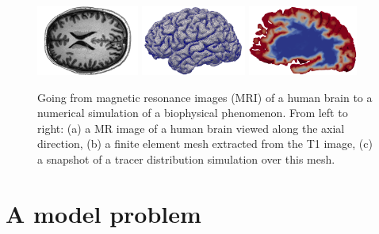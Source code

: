 \begin{figure}[t]
  \begin{center}
  \includegraphics[height=2.3cm]{./chapters/chp1/FIG/T1-image-rot-white}
  \includegraphics[height=2.3cm]{./chapters/chp1/FIG/ernie-volume-64}
  \includegraphics[height=2.3cm]{./chapters/chp1/FIG/soltn-t30-crop}
  \hfill
  \end{center}
  \caption{Going from magnetic resonance images (MRI) of a human brain
    to a numerical simulation of a biophysical phenomenon. From left
    to right: (a) a MR image of a human brain viewed along the axial
    direction, (b) a finite element mesh extracted from the T1 image,
    (c) a snapshot of a tracer distribution simulation over this mesh.}
  \label{fig:chp1:pipeline}
\end{figure}

\section{A model problem}

